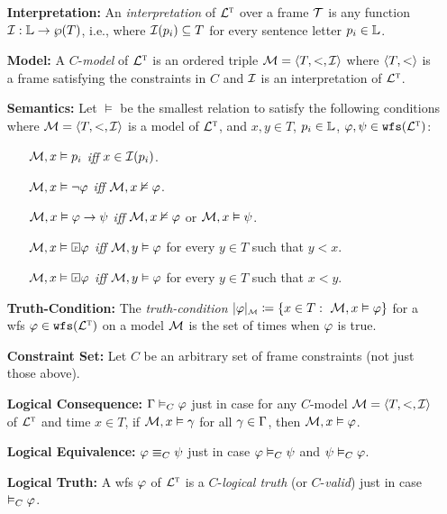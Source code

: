 \documentclass[a4paper, 11pt]{article} %
\begin{document}
\begin{enumerate}[leftmargin=1.2in] %
  \item[\bf Interpretation:] An \textit{interpretation} of $\TL$ over a frame $\T$ is any function $\I : \SL \to \wp(T)$, i.e., where $\I(p_i) \subseteq T$ for every sentence letter $p_i \in \SL$.
	\item[\bf Model:] A $C$-\textit{model} of $\TL$ is an ordered triple $\M = \tuple{T, <, \I}$ where $\tuple{T, <}$ is a frame satisfying the constraints in $C$ and $\I$ is an interpretation of $\TL$.
  \item[\bf Semantics:] Let $\vDash$ be the smallest relation to satisfy the following conditions where $\M = \tuple{T, <, \I}$ is a model of $\TL$, and $x, y \in T$, $p_i \in \SL$, $\metaA, \metaB \in \wfs{\TL}$:
    \begin{itemize}[leftmargin=.15in]\small
      \item[] $\M, x \vDash p_i$ \textit{iff} $x \in \I(p_i)$.
      \item[] $\M, x \vDash \neg \metaA$ \textit{iff} $\M, x\nvDash \metaA$.
      \item[] $\M, x \vDash \metaA\rightarrow \metaB$ \textit{iff} $\M, x\nvDash \metaA$ or $\M, x \vDash  \metaB$.
      \item[] $\M, x \vDash \Past \metaA$ \textit{iff} $\M, y\vDash \metaA$ for every $y \in T$ such that $y < x$.
      \item[] $\M, x \vDash \Future \metaA$ \textit{iff} $\M, y\vDash \metaA$ for every $y \in T$ such that $x < y$.
    \end{itemize}
  \item[\bf Truth-Condition:] The \textit{truth-condition} $\interpret{\M}{\metaA} \coloneq \set{x \in T: ~\M, x \vDash \metaA}$ for a wfs $\metaA \in \wfs{\TL}$ on a model $\M$ is the set of times when $\metaA$ is true.
  \item[\bf Constraint Set:] Let $C$ be an arbitrary set of frame constraints (not just those above).
  \item[\bf Logical Consequence:] $\MetaG \MLmodels[C] \metaA$ just in case for any $C$-model $\M = \tuple{T, <, \I}$ of $\TL$ and time $x \in T$, if $\M, x \vDash \metaG$ for all $\metaG \in \MetaG$, then $\M, x \vDash \metaA$.
  \item[\bf Logical Equivalence:] $\metaA \MLequiv[C] \metaB$ just in case $\metaA \MLmodels[C] \metaB$ and $\metaB \MLmodels[C] \metaA$.
  \item[\bf Logical Truth:] A wfs $\metaA$ of $\TL$ is a $C$-\textit{logical truth} (or $C$-\textit{valid}) just in case $\MLmodels[C] \metaA$.

\end{enumerate}
\end{document}
